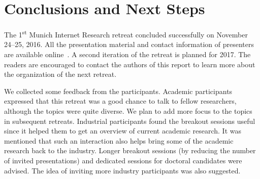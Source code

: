 \section{Conclusions and Next Steps}\label{sec:conclusion}

The 1\textsuperscript{st} Munich Internet Research retreat concluded
successfully on November 24--25, 2016. All
the presentation material and contact information of presenters are
available online~\cite{mir-materials}. A second iteration of the retreat is
planned for 2017.  The readers are encouraged to contact the authors of this
report to learn more about the organization of the next retreat.

We collected some feedback from the participants. Academic participants
expressed that this retreat was a good chance to talk to fellow researchers,
although the topics were quite diverse. We plan to add more focus to the
topics in subsequent retreats. Industrial participants found the breakout
sessions useful since it helped them to get an overview of current academic
research. It was mentioned that such an interaction also helps bring some of
the academic research back to the industry. Longer breakout sessions (by
reducing the number of invited presentations) and dedicated sessions for
doctoral candidates were advised. The idea of inviting more industry
participants was also suggested.






